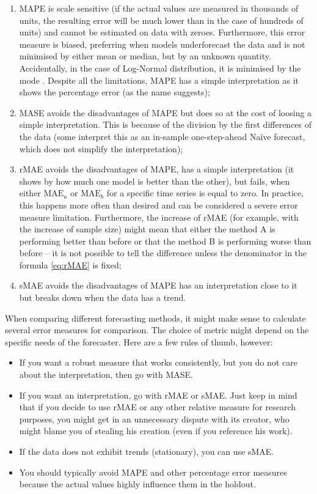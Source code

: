 \documentclass[]{book}
\providecommand{\tightlist}{%
  \setlength{\itemsep}{0pt}\setlength{\parskip}{0pt}}
\theoremstyle{definition}
\theoremstyle{definition}
\theoremstyle{definition}
\theoremstyle{definition}
\theoremstyle{remark}
\begin{document}
\begin{enumerate}
\def\labelenumi{\arabic{enumi}.}
\tightlist
\item
  MAPE is scale sensitive (if the actual values are measured in thousands of units, the resulting error will be much lower than in the case of hundreds of units) and cannot be estimated on data with zeroes. Furthermore, this error measure is biased, preferring when models underforecast the data \citep[see, for example,][]{Makridakis1993} and is not minimised by either mean or median, but by an unknown quantity. Accidentally, in the case of Log-Normal distribution, it is minimised by the mode \citep[see discussion in][]{Kolassa2016}. Despite all the limitations, MAPE has a simple interpretation as it shows the percentage error (as the name suggests);
\item
  MASE avoids the disadvantages of MAPE but does so at the cost of loosing a simple interpretation. This is because of the division by the first differences of the data (some interpret this as an in-sample one-step-ahead Naïve forecast, which does not simplify the interpretation);
\item
  rMAE avoids the disadvantages of MAPE, has a simple interpretation (it shows by how much one model is better than the other), but fails, when either \(\mathrm{MAE}_a\) or \(\mathrm{MAE}_b\) for a specific time series is equal to zero. In practice, this happens more often than desired and can be considered a severe error measure limitation. Furthermore, the increase of rMAE (for example, with the increase of sample size) might mean that either the method A is performing better than before or that the method B is performing worse than before -- it is not possible to tell the difference unless the denominator in the formula \eqref{eq:rMAE} is fixed;
\item
  sMAE avoids the disadvantages of MAPE has an interpretation close to it but breaks down when the data has a trend.
\end{enumerate}

When comparing different forecasting methods, it might make sense to calculate several error measures for comparison. The choice of metric might depend on the specific needs of the forecaster. Here are a few rules of thumb, however:

\begin{itemize}
\tightlist
\item
  If you want a robust measure that works consistently, but you do not care about the interpretation, then go with MASE.
\item
  If you want an interpretation, go with rMAE or sMAE. Just keep in mind that if you decide to use rMAE or any other relative measure for research purposes, you might get in an unnecessary dispute with its creator, who might blame you of stealing his creation (even if you reference his work).
\item
  If the data does not exhibit trends (stationary), you can use sMAE.
\item
  You should typically avoid MAPE and other percentage error measures because the actual values highly influence them in the holdout.
\end{itemize}
\end{document}
